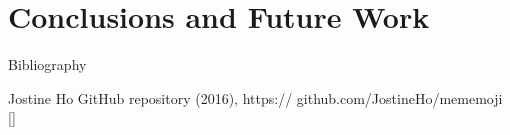 \documentclass[compress]{beamer}
\begin{document}
\section{Conclusions and Future Work}

\begin{frame}{Bibliography}
    \begin{thebibliography}{10}

\beamertemplatearticlebibitems
      Jostine Ho       
      \newblock {}
      \newblock GitHub repository (2016), https:// github.com/JostineHo/mememoji [\href{https:// github.com/JostineHo/mememoji}{\faGithub}]


    \end{thebibliography}
\end{frame}




\closingtitle


\end{document}
